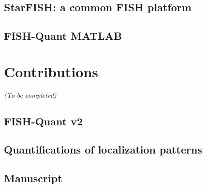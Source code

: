 


\subsection{StarFISH: a common \ac{FISH} platform}
\label{subsec:intro_starfish}

\subsection{FISH-Quant MATLAB}
\label{subsec:intro_fq1}


\section{Contributions}
\label{sec:contributions}

\begin{center}
	\textit{(To be completed)}
\end{center}

\subsection{FISH-Quant v2}
\label{subsec:intro_fq2}

\subsection{Quantifications of localization patterns}
\label{subsec:intro_applications}

\subsection{Manuscript}
\label{subsec:intro_manuscript}


